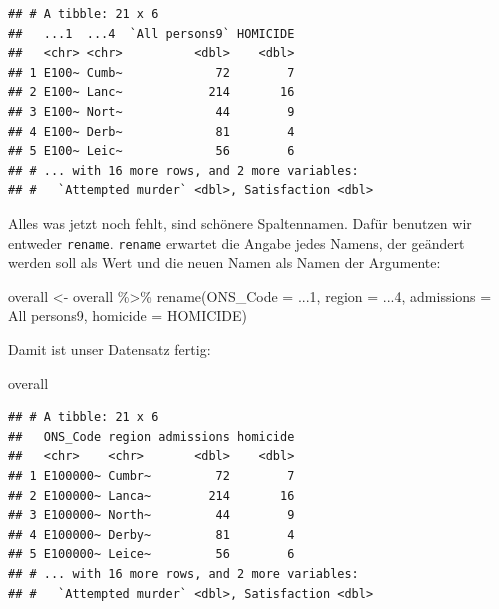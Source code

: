 \documentclass[
]{book}
\newenvironment{Shaded}{\begin{snugshade}}{\end{snugshade}}
\newcommand{\FunctionTok}[1]{\textcolor[rgb]{0.00,0.00,0.00}{#1}}
\newcommand{\NormalTok}[1]{#1}
\newcommand{\OtherTok}[1]{\textcolor[rgb]{0.56,0.35,0.01}{#1}}
\newcommand{\SpecialCharTok}[1]{\textcolor[rgb]{0.00,0.00,0.00}{#1}}
\newcommand{\StringTok}[1]{\textcolor[rgb]{0.31,0.60,0.02}{#1}}
\begin{document}
\begin{verbatim}
## # A tibble: 21 x 6
##   ...1  ...4  `All persons9` HOMICIDE
##   <chr> <chr>          <dbl>    <dbl>
## 1 E100~ Cumb~             72        7
## 2 E100~ Lanc~            214       16
## 3 E100~ Nort~             44        9
## 4 E100~ Derb~             81        4
## 5 E100~ Leic~             56        6
## # ... with 16 more rows, and 2 more variables:
## #   `Attempted murder` <dbl>, Satisfaction <dbl>
\end{verbatim}

Alles was jetzt noch fehlt, sind schönere Spaltennamen. Dafür benutzen wir entweder \texttt{rename}.
\texttt{rename} erwartet die Angabe jedes Namens, der geändert werden soll als Wert und die neuen Namen als Namen der Argumente:

\begin{Shaded}
\begin{Highlighting}[]
\NormalTok{overall }\OtherTok{\textless{}{-}}\NormalTok{ overall }\SpecialCharTok{\%\textgreater{}\%} 
  \FunctionTok{rename}\NormalTok{(}\StringTok{\textquotesingle{}ONS\_Code\textquotesingle{}} \OtherTok{=} \StringTok{\textquotesingle{}...1\textquotesingle{}}\NormalTok{,}
         \StringTok{\textquotesingle{}region\textquotesingle{}} \OtherTok{=} \StringTok{\textquotesingle{}...4\textquotesingle{}}\NormalTok{,}
         \StringTok{\textquotesingle{}admissions\textquotesingle{}} \OtherTok{=} \StringTok{\textquotesingle{}All persons9\textquotesingle{}}\NormalTok{,}
         \StringTok{\textquotesingle{}homicide\textquotesingle{}} \OtherTok{=} \StringTok{\textquotesingle{}HOMICIDE\textquotesingle{}}\NormalTok{)}
\end{Highlighting}
\end{Shaded}

Damit ist unser Datensatz fertig:

\begin{Shaded}
\begin{Highlighting}[]
\NormalTok{overall}
\end{Highlighting}
\end{Shaded}

\begin{verbatim}
## # A tibble: 21 x 6
##   ONS_Code region admissions homicide
##   <chr>    <chr>       <dbl>    <dbl>
## 1 E100000~ Cumbr~         72        7
## 2 E100000~ Lanca~        214       16
## 3 E100000~ North~         44        9
## 4 E100000~ Derby~         81        4
## 5 E100000~ Leice~         56        6
## # ... with 16 more rows, and 2 more variables:
## #   `Attempted murder` <dbl>, Satisfaction <dbl>
\end{verbatim}
\end{document}
